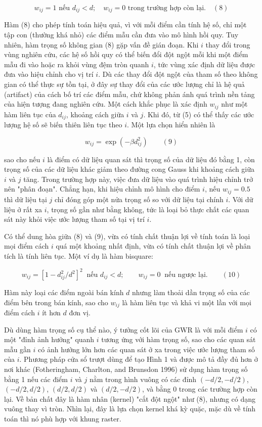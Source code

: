 \[w_{ij} = 1 \text{ nếu } d_{ij} < d; \quad w_{ij} = 0 \text{ trong trường hợp còn lại.} \quad (8)\]

Hàm (8) cho phép tính toán hiệu quả, vì với mỗi điểm cần tính hệ số, chỉ một tập con (thường khá nhỏ) các điểm mẫu cần đưa vào mô hình hồi quy. Tuy nhiên, hàm trọng số không gian (8) gặp vấn đề gián đoạn. Khi \(i\) thay đổi trong vùng nghiên cứu, các hệ số hồi quy có thể biến đổi đột ngột mỗi khi một điểm mẫu đi vào hoặc ra khỏi vùng đệm tròn quanh \(i\), tức vùng xác định dữ liệu được đưa vào hiệu chỉnh cho vị trí \(i\). Dù các thay đổi đột ngột của tham số theo không gian có thể thực sự tồn tại, ở đây sự thay đổi của các ước lượng chỉ là hệ quả (artifact) của cách bố trí các điểm mẫu, chứ không phản ánh quá trình nền tảng của hiện tượng đang nghiên cứu. Một cách khắc phục là xác định \(w_{ij}\) như một hàm liên tục của \(d_{ij}\), khoảng cách giữa \(i\) và \(j\). Khi đó, từ (5) có thể thấy các ước lượng hệ số sẽ biến thiên liên tục theo \(i\). Một lựa chọn hiển nhiên là

\[w_{ij} = \exp(-\beta d_{ij}^2) \qquad (9)\]

sao cho nếu \(i\) là điểm có dữ liệu quan sát thì trọng số của dữ liệu đó bằng 1, còn trọng số của các dữ liệu khác giảm theo đường cong Gauss khi khoảng cách giữa \(i\) và \(j\) tăng. Trong trường hợp này, việc đưa dữ liệu vào quá trình hiệu chỉnh trở nên "phân đoạn". Chẳng hạn, khi hiệu chỉnh mô hình cho điểm \(i\), nếu \(w_{ij} = 0.5\) thì dữ liệu tại \(j\) chỉ đóng góp một nửa trọng số so với dữ liệu tại chính \(i\). Với dữ liệu ở rất xa \(i\), trọng số gần như bằng không, tức là loại bỏ thực chất các quan sát này khỏi việc ước lượng tham số tại vị trí \(i\).

Có thể dung hòa giữa (8) và (9), vừa có tính chất thuận lợi về tính toán là loại mọi điểm cách \(i\) quá một khoảng nhất định, vừa có tính chất thuận lợi về phân tích là tính liên tục. Một ví dụ là hàm bisquare:

\[w_{ij} = \left[1 - d_{ij}^2/d^2\right]^2 \ \text{ nếu } d_{ij} < d; \qquad w_{ij} = 0 \ \text{ nếu ngược lại.} \qquad (10)\]

Hàm này loại các điểm ngoài bán kính \(d\) nhưng làm thoải dần trọng số của các điểm bên trong bán kính, sao cho \(w_{ij}\) là hàm liên tục và khả vi một lần với mọi điểm cách \(i\) ít hơn \(d\) đơn vị.

Dù dùng hàm trọng số cụ thể nào, ý tưởng cốt lõi của GWR là với mỗi điểm \(i\) có một "đỉnh ảnh hưởng" quanh \(i\) tương ứng với hàm trọng số, sao cho các quan sát mẫu gần \(i\) có ảnh hưởng lớn hơn các quan sát ở xa trong việc ước lượng tham số của \(i\). Phương pháp cửa sổ trượt dùng để tạo Hình 1 và được mô tả đầy đủ hơn ở nơi khác (Fotheringham, Charlton, and Brunsdon 1996) sử dụng hàm trọng số bằng 1 nếu các điểm \(i\) và \(j\) nằm trong hình vuông có các đỉnh \((-d/2,-d/2)\), \((-d/2,d/2)\), \((d/2,d/2)\) và \((d/2,-d/2)\), và bằng 0 trong các trường hợp còn lại. Về bản chất đây là hàm nhân (kernel) "cắt đột ngột" như (8), nhưng có dạng vuông thay vì tròn. Nhìn lại, đây là lựa chọn kernel khá kỳ quặc, mặc dù về tính toán thì nó phù hợp với khung raster.

